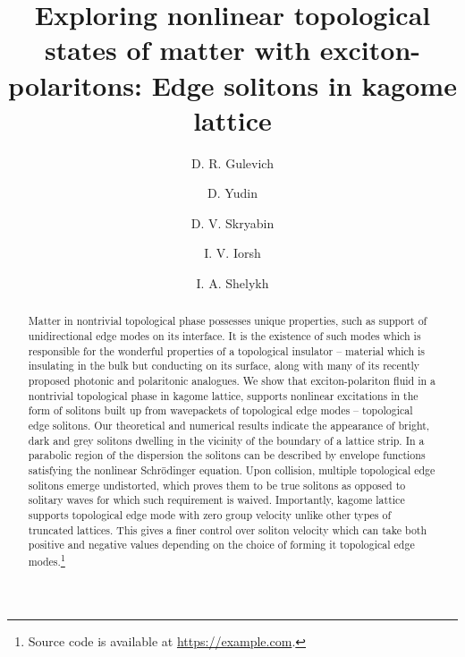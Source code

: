 \documentclass[
aps,
prl,
groupedaddress,
superscriptaddress,
floatfix,
notitlepage
]{revtex4-1}
\begin{document}
\title{Exploring nonlinear topological states of matter with exciton-polaritons: Edge solitons in kagome lattice}

\author{D. R. Gulevich} 

\author{D. Yudin} 

\author{D. V. Skryabin} 

\author{I. V. Iorsh} 

\author{I. A. Shelykh} 


\begin{abstract}
Matter in nontrivial topological phase possesses unique properties, such as support of unidirectional edge modes on its interface. It is the existence of such modes which is responsible for the wonderful properties of a topological insulator -- material which is insulating in the bulk but conducting on its surface, along with many of its recently proposed photonic and polaritonic analogues. We show that exciton-polariton fluid in a nontrivial topological phase in kagome lattice, supports nonlinear excitations in the form of solitons built up from wavepackets of topological edge modes -- topological edge solitons. Our theoretical and numerical results indicate the appearance of bright, dark and grey solitons dwelling in the vicinity of the boundary of a lattice strip. In a parabolic region of the dispersion the solitons can be described by envelope functions satisfying the nonlinear Schr\"odinger equation. 
Upon collision, multiple topological edge solitons emerge undistorted, which proves them to be true solitons as opposed to solitary waves for which such requirement is waived. Importantly, kagome lattice supports topological edge mode with zero group velocity unlike other types of truncated lattices. This gives a finer control over soliton velocity which can take both positive and negative values depending on the choice of forming it topological edge modes.\footnote{Source code is available at \url{https://example.com}.}
\end{abstract}
\end{document}
